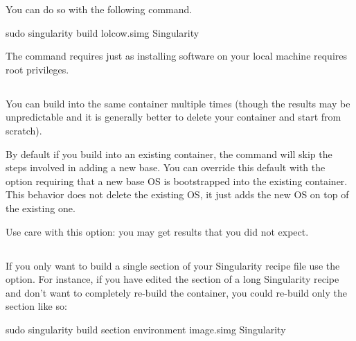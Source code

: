 \documentclass[letterpaper,10pt,english]{sphinxmanual}
\begin{document}
You can do so with the following command.

%
\begin{sphinxVerbatim}[commandchars=\\\{\}]
\PYGZdl{} sudo singularity build lolcow.simg Singularity
\end{sphinxVerbatim}

The command requires  just as installing software on your local machine
requires root privileges.


\subsection{}
\label{\detokenize{build_a_container:force}}
You can build into the same container multiple times (though the
results may be unpredictable and it is generally better to delete your
container and start from scratch).

By default if you build into an existing container, the  command will
skip the steps involved in adding a new base. You can override this
default with the  option requiring that a new base OS is bootstrapped
into the existing container. This behavior does not delete the
existing OS, it just adds the new OS on top of the existing one.

Use care with this option: you may get results that you did not
expect.


\subsection{}
\label{\detokenize{build_a_container:section}}
If you only want to build a single section of your Singularity recipe
file use the  option. For instance, if you have edited the  section of a
long Singularity recipe and don’t want to completely re-build the
container, you could re-build only the  section like so:

%
\begin{sphinxVerbatim}[commandchars=\\\{\}]
\PYGZdl{} sudo singularity build \PYGZhy{}\PYGZhy{}section environment image.simg Singularity
\end{sphinxVerbatim}
\end{document}
